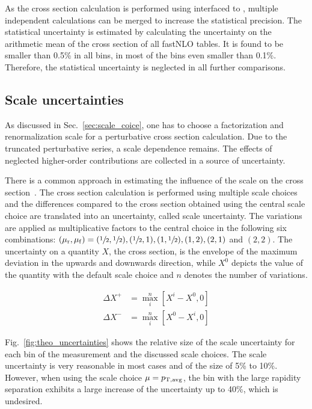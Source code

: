 As the cross section calculation is performed using \fastNLO interfaced to
\NLOJETPP, multiple independent calculations can be merged to increase the
statistical precision. The statistical uncertainty is estimated by calculating
the uncertainty on the arithmetic mean of the cross section of all fastNLO
tables. It is found to be smaller than 0.5\% in all
bins, in most of the bins even smaller than 0.1\%. Therefore, the statistical
uncertainty is neglected in all further comparisons.

\subsection{Scale uncertainties}
\label{sec:scale_uncertainties}

As discussed in Sec.~\ref{sec:scale_coice}, one has to choose a factorization
and renormalization scale for a perturbative cross section calculation. Due to
the truncated perturbative series, a scale dependence remains. The effects of
neglected higher-order contributions are collected in a source of uncertainty.

There is a common approach in estimating the influence of the scale on the cross
section~\cite{Cacciari:2003fi}. The cross section calculation is performed using
multiple scale choices and the differences compared to the cross section
obtained using the central scale choice are translated into an uncertainty,
called scale uncertainty. The variations are applied as multiplicative factors
to the central choice in the following six combinations: $(\mu_{\mathrm{r}}, \mu_{\mathrm{f}}) =
(\sfrac{1}{2}, \sfrac{1}{2}), (\sfrac{1}{2}, 1), (1, \sfrac{1}{2}), (1, 2), (2,
1)$ and $(2, 2)$. The uncertainty on a quantity $X$, \eg the cross section, is
the envelope of the maximum deviation in the upwards and downwards direction,
while $X^0$ depicts the value of the quantity with the default scale choice and
$n$ denotes the number of variations.

\begin{align*}
    \Delta X^+ &= \max_{i}^{n} \left[ X^i - X^0, 0 \right]\\
    \Delta X^- &= \max_{i}^{n} \left[ X^0 - X^i, 0 \right]
\end{align*}


Fig.~\ref{fig:theo_uncertainties} shows the relative size of the scale
uncertainty for each bin of the measurement and the discussed scale choices. The
scale uncertainty is very reasonable in most cases and of the size of 5\% to
10\%. However, when using the scale choice $\mu=p_{\mathrm{T,avg}}$, the bin with the large
rapidity separation exhibits a large increase of the uncertainty up to 40\%,
which is undesired.


